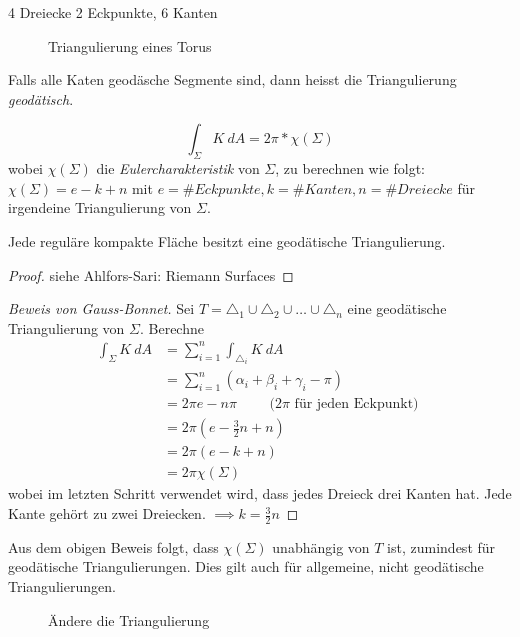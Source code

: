 \documentclass[../main.tex]{subfiles}
\begin{document}
\begin{example}
    4 Dreiecke
    2 Eckpunkte, 6 Kanten
    \begin{figure}[htb]
        \centering
        \def\svgwidth{10em}
        
        \caption{Triangulierung eines Torus}        
    \end{figure}
\end{example}
Falls alle Katen geodäsche Segmente sind, dann heisst die Triangulierung \emph{geodätisch}.

\begin{theorem}
    $$\int_{\Sigma}K \ dA = 2 \pi * \chi (\Sigma)$$ wobei $\chi (\Sigma)$ die \emph{Eulercharakteristik} von $\Sigma$, zu berechnen wie folgt:
    $\chi (\Sigma) = e - k + n$ mit $e= \#Eckpunkte, k=\#Kanten, n=\#Dreiecke$ für irgendeine Triangulierung von $\Sigma$.
\end{theorem}

\begin{theorem}
    Jede reguläre kompakte Fläche besitzt eine geodätische Triangulierung.
\end{theorem}
\begin{proof}
    siehe Ahlfors-Sari: Riemann Surfaces
\end{proof}

\begin{proof}[Beweis von Gauss-Bonnet]
    Sei $T= \triangle_1 \cup \triangle_2 \cup \dots \cup \triangle_n$ eine geodätische Triangulierung von $\Sigma$.
    Berechne
    \begin{align*}
        \int_{\Sigma} K \ dA &= \sum_{i=1}^n \int_{\triangle _i} K \ dA \\
        &= \sum_{i=1} ^n (\alpha _i + \beta _i + \gamma _i - \pi) \\
        &= 2 \pi e - n \pi \qquad \text{ ($2 \pi$ für jeden Eckpunkt) } \\
        &= 2 \pi (e - \frac{3}{2}n + n) \\
        &= 2 \pi (e - k + n) \\
        &= 2 \pi \chi (\Sigma)
    \end{align*}wobei im letzten Schritt verwendet wird, dass jedes Dreieck drei Kanten hat.
    Jede Kante gehört zu zwei Dreiecken. $\implies k = \frac{3}{2}n$
\end{proof}

\begin{remark}
    Aus dem obigen Beweis folgt, dass $\chi (\Sigma)$ unabhängig von $T$ ist, zumindest für geodätische Triangulierungen.
    Dies gilt auch für allgemeine, nicht geodätische Triangulierungen.
    \begin{figure}[htb]
        \centering
        \def\svgwidth{20em}
        
        \caption{Ändere die Triangulierung}        
    \end{figure}
\end{remark}
\end{document}
